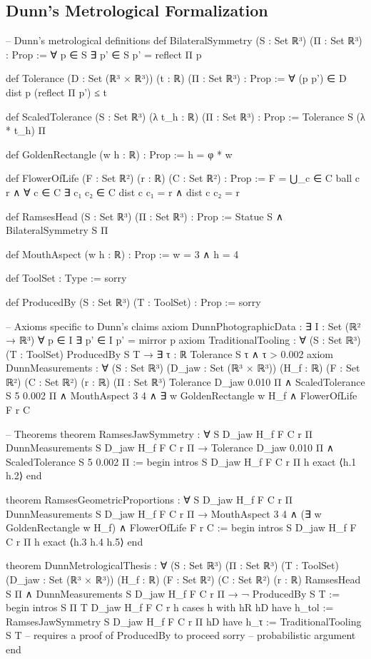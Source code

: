 \documentclass[12pt]{amsart}
\begin{document}
\subsection{Dunn's Metrological Formalization}
\begin{leanlisting}
	-- Dunn's metrological definitions
	def BilateralSymmetry (S : Set ℝ³) (Π : Set ℝ³) : Prop :=
	∀ p ∈ S   ∃ p' ∈ S   p' = reflect Π p
	
	def Tolerance (D : Set (ℝ³ × ℝ³)) (t : ℝ) (Π : Set ℝ³) : Prop :=
	∀ (p   p') ∈ D   dist p (reflect Π p') ≤ t
	
	def ScaledTolerance (S : Set ℝ³) (λ t_h : ℝ) (Π : Set ℝ³) : Prop :=
	Tolerance S (λ * t_h) Π
	
	def GoldenRectangle (w h : ℝ) : Prop := h = φ * w
	
	def FlowerOfLife (F : Set ℝ²) (r : ℝ) (C : Set ℝ²) : Prop :=
	F = ⋃_{c ∈ C} ball c r ∧
	∀ c ∈ C   ∃ c₁ c₂ ∈ C   dist c c₁ = r ∧ dist c c₂ = r
	
	def RamsesHead (S : Set ℝ³) (Π : Set ℝ³) : Prop :=
	Statue S ∧ BilateralSymmetry S Π
	
	def MouthAspect (w h : ℝ) : Prop := w = 3 ∧ h = 4
	
	def ToolSet : Type := sorry
	
	def ProducedBy (S : Set ℝ³) (T : ToolSet) : Prop := sorry
	
	-- Axioms specific to Dunn's claims
	axiom DunnPhotographicData : ∃ I : Set (ℝ² → ℝ³)   ∀ p ∈ I   ∃ p' ∈ I   p' = mirror p
	axiom TraditionalTooling : ∀ (S : Set ℝ³) (T : ToolSet)   ProducedBy S T → ∃ τ : ℝ   Tolerance S τ ∧ τ > 0.002
	axiom DunnMeasurements : 
	∀ (S : Set ℝ³) (D_jaw : Set (ℝ³ × ℝ³)) (H_f : ℝ) (F : Set ℝ²) (C : Set ℝ²) (r : ℝ) (Π : Set ℝ³)  
	Tolerance D_jaw 0.010 Π ∧
	ScaledTolerance S 5 0.002 Π ∧
	MouthAspect 3 4 ∧
	∃ w   GoldenRectangle w H_f ∧
	FlowerOfLife F r C
	
	-- Theorems
	theorem RamsesJawSymmetry :
	∀ S D_jaw H_f F C r Π  
	DunnMeasurements S D_jaw H_f F C r Π →
	Tolerance D_jaw 0.010 Π ∧ ScaledTolerance S 5 0.002 Π :=
	begin
	intros S D_jaw H_f F C r Π h  
	exact ⟨h.1   h.2⟩  
	end
	
	theorem RamsesGeometricProportions :
	∀ S D_jaw H_f F C r Π  
	DunnMeasurements S D_jaw H_f F C r Π →
	MouthAspect 3 4 ∧
	(∃ w   GoldenRectangle w H_f) ∧
	FlowerOfLife F r C :=
	begin
	intros S D_jaw H_f F C r Π h  
	exact ⟨h.3   h.4   h.5⟩  
	end
	
	theorem DunnMetrologicalThesis :
	∀ (S : Set ℝ³) (Π : Set ℝ³) (T : ToolSet) (D_jaw : Set (ℝ³ × ℝ³)) (H_f : ℝ) (F : Set ℝ²) (C : Set ℝ²) (r : ℝ)  
	RamsesHead S Π ∧ DunnMeasurements S D_jaw H_f F C r Π →
	¬ ProducedBy S T :=
	begin
	intros S Π T D_jaw H_f F C r h  
	cases h with hR hD  
	have h_tol := RamsesJawSymmetry S D_jaw H_f F C r Π hD  
	have h_τ := TraditionalTooling S T   -- requires a proof of ProducedBy to proceed
	sorry -- probabilistic argument
	end
\end{leanlisting}
\end{document}
